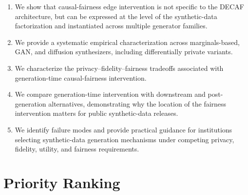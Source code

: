 \documentclass[11pt]{article}
\begin{document}
\begin{enumerate}
    \item We show that causal-fairness edge intervention is not specific to the DECAF architecture, but can be expressed at the level of the synthetic-data factorization and instantiated across multiple generator families.

    \item We provide a systematic empirical characterization across marginals-based, GAN, and diffusion synthesizers, including differentially private variants.

    \item We characterize the privacy--fidelity--fairness tradeoffs associated with generation-time causal-fairness intervention.

    \item We compare generation-time intervention with downstream and post-generation alternatives, demonstrating why the location of the fairness intervention matters for public synthetic-data releases.

    \item We identify failure modes and provide practical guidance for institutions selecting synthetic-data generation mechanisms under competing privacy, fidelity, utility, and fairness requirements.
\end{enumerate}

\section*{Priority Ranking}
\end{document}
